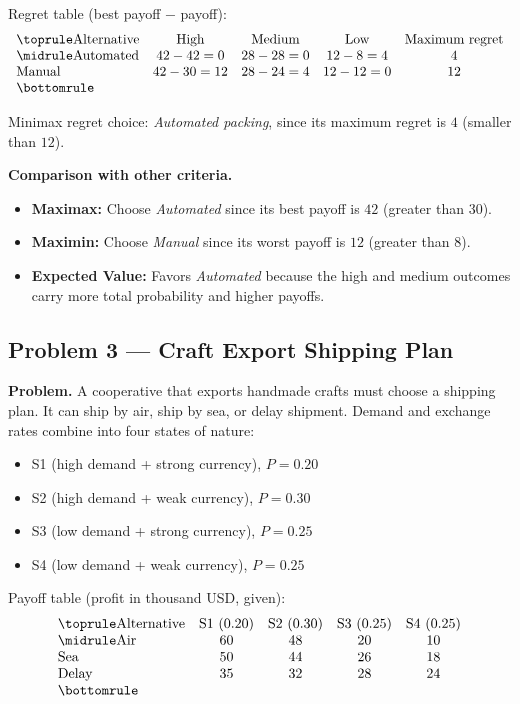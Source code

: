 	Regret table (best payoff $-$ payoff):
	\[
	\begin{array}{lcccc}
		\toprule
		\text{Alternative} & \text{High} & \text{Medium} & \text{Low} & \text{Maximum regret}\\
		\midrule
		\text{Automated} & 42-42=0 & 28-28=0 & 12-8=4 & 4\\
		\text{Manual} & 42-30=12 & 28-24=4 & 12-12=0 & 12\\
		\bottomrule
	\end{array}
	\]
	
	Minimax regret choice: \emph{Automated packing}, since its maximum regret is $4$ (smaller than $12$).
	
	\textbf{Comparison with other criteria.}
	\begin{itemize}
		\item \textbf{Maximax:} Choose \emph{Automated} since its best payoff is $42$ (greater than $30$).
		\item \textbf{Maximin:} Choose \emph{Manual} since its worst payoff is $12$ (greater than $8$).
		\item \textbf{Expected Value:} Favors \emph{Automated} because the high and medium outcomes carry more total probability and higher payoffs.
	\end{itemize}
	
	\hypertarget{c6-ex3}{}
	\subsection*{Problem 3 — Craft Export Shipping Plan}
	
	\textbf{Problem.} A cooperative that exports handmade crafts must choose a shipping plan. It can ship by air, ship by sea, or delay shipment. Demand and exchange rates combine into four states of nature:
	\begin{itemize}
		\item S1 (high demand + strong currency), $P=0.20$
		\item S2 (high demand + weak currency), $P=0.30$
		\item S3 (low demand + strong currency), $P=0.25$
		\item S4 (low demand + weak currency), $P=0.25$
	\end{itemize}
	
	Payoff table (profit in thousand USD, given):
	\[
	\begin{array}{lcccc}
		\toprule
		\text{Alternative} & \text{S1 }(0.20) & \text{S2 }(0.30) & \text{S3 }(0.25) & \text{S4 }(0.25)\\
		\midrule
		\text{Air} & 60 & 48 & 20 & 10\\
		\text{Sea} & 50 & 44 & 26 & 18\\
		\text{Delay} & 35 & 32 & 28 & 24\\
		\bottomrule
	\end{array}
	\]
	
